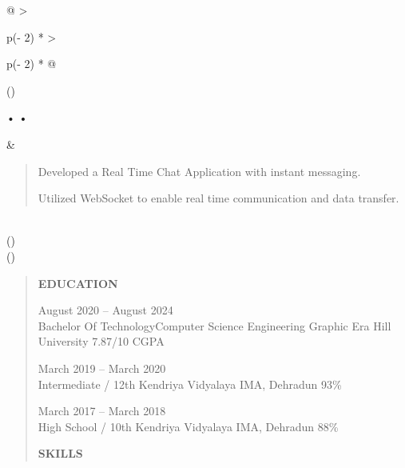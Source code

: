 \documentclass[
]{article}
\begin{document}
\begin{longtable}[]{@{}
  >{\raggedright\arraybackslash}p{(\columnwidth - 2\tabcolsep) * }
  >{\raggedright\arraybackslash}p{(\columnwidth - 2\tabcolsep) * }@{}}
\toprule()
\begin{minipage}[b]{\linewidth}\raggedright
• •
\end{minipage} & \begin{minipage}[b]{\linewidth}\raggedright
\begin{quote}
Developed a Real Time Chat Application with instant messaging.

Utilized WebSocket to enable real time communication and data transfer.
\end{quote}
\end{minipage} \\
\midrule()
\endhead
{} \\
\bottomrule()
\end{longtable}

\begin{quote}
\textbf{EDUCATION}

August 2020 -- August 2024\\
Bachelor Of TechnologyComputer Science Engineering \textbar{} Graphic
Era Hill University \textbar{} 7.87/10 CGPA

March 2019 -- March 2020\\
Intermediate / 12th \textbar{} Kendriya Vidyalaya IMA, Dehradun
\textbar{} 93\%

March 2017 -- March 2018\\
High School / 10th \textbar{} Kendriya Vidyalaya IMA, Dehradun
\textbar{} 88\%

\textbf{SKILLS}
\end{quote}
\end{document}
